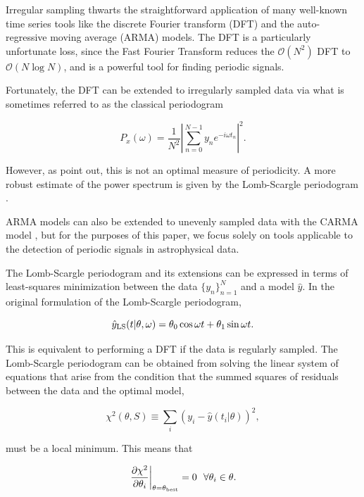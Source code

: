 \documentclass[iop]{emulateapj}
\newcommand{\bigO}{\mathcal{O}}
\begin{document}
Irregular sampling thwarts the straightforward application of many well-known 
time series tools like the discrete Fourier transform (DFT) and the auto-regressive 
moving average (ARMA) models. The DFT is a particularly unfortunate loss, since
the Fast Fourier Transform \citep{Cooley+Tukey_1965} reduces the $\bigO(N^2)$ DFT
to $\bigO(N\log N)$, and is a powerful tool for finding periodic signals.

Fortunately, the DFT can be extended to irregularly sampled data via what is sometimes
referred to as the classical periodogram \citep{Stoica+Li+He_2009}

\begin{equation}
    P_x(\omega) = \frac{1}{N^2}\left|\sum_{n=0}^{N - 1} y_n e^{- i \omega t_n}\right|^2.
\end{equation}

However, as \cite{Stoica+Li+He_2009} point out, this is not an
optimal measure of periodicity. A more robust estimate of the power spectrum is
given by the Lomb-Scargle periodogram \citep{Lomb_1976,Scargle_1982,Barning_1963,Vanicek_1971}.

ARMA models can also be extended to unevenly sampled data with the CARMA
model \citep{Kelly_etal_2014, Zinn_etal_2016}, but for the purposes of this paper, 
we focus solely on tools applicable to the detection of periodic signals in astrophysical data. 

The Lomb-Scargle periodogram and its extensions can be expressed in terms of 
least-squares minimization between the data $\{y_n\}_{n=1}^N$ and a model $\hat{y}$.
In the original formulation of the Lomb-Scargle periodogram, 

\begin{equation}
    \hat{y}_{\rm LS}(t|\theta, \omega) = \theta_0\cos{\omega t} + \theta_1\sin{\omega t}.
\end{equation}

This is equivalent to performing a DFT if the data is regularly sampled. The Lomb-Scargle
periodogram can be obtained from solving the linear system of equations that arise from
the condition that the summed squares of residuals between the data and the optimal
model,

\begin{equation}
\chi^2(\theta, S) \equiv \sum_i (y_i - \hat{y}(t_i|\theta) )^2,
\end{equation}

\noindent must be a local minimum. This means that

\begin{equation}
    \left.\frac{\partial\chi^2}{\partial\theta_i}\right|_{\theta=\theta_{\rm best}} = 0~~\forall\theta_i\in\theta.
\end{equation}
\end{document}
